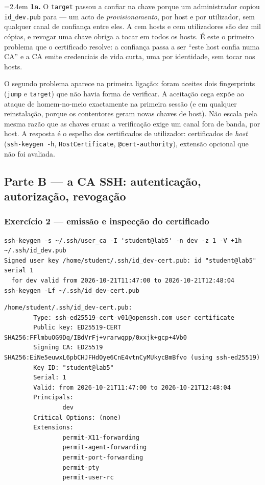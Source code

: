 \documentclass[a4paper,11pt]{article}
\newenvironment{answer}[1]{%
  \par\addvspace{7pt}\noindent
  \hangindent=2.4em\hangafter=1
  {\color{sscnblue}\bfseries #1\hspace{0.55em}}\ignorespaces}
  {\par\addvspace{5pt}}
\newcommand{\cmd}[1]{\textcolor{sscnblue}{\texttt{#1}}}
\newcommand{\file}[1]{\texttt{\detokenize{#1}}}
\begin{document}
\begin{answer}{1a.}
O \cmd{target} passou a confiar na chave porque um administrador copiou
\cmd{id\_dev.pub} para \file{/home/dev/.ssh/authorized_keys} --- um acto de
\emph{provisionamento}, por host e por utilizador, sem qualquer canal de confian\c{c}a
entre eles. A cem hosts e cem utilizadores s\~ao dez mil c\'opias, e revogar uma chave
obriga a tocar em todos os hosts. \'E este o primeiro problema que o certificado resolve:
a confian\c{c}a passa a ser ``este host confia numa CA'' e a CA emite credenciais de vida
curta, uma por identidade, sem tocar nos hosts.

O segundo problema aparece na primeira liga\c{c}\~ao: foram aceites dois fingerprints
(\cmd{jump} e \cmd{target}) que n\~ao havia forma de verificar. A aceita\c{c}\~ao cega
exp\~oe ao ataque de homem-no-meio exactamente na primeira sess\~ao (e em qualquer
reinstala\c{c}\~ao, porque os contentores geram novas chaves de host). N\~ao escala pela
mesma raz\~ao que as chaves cruas: a verifica\c{c}\~ao exige um canal fora de banda, por
host. A resposta \'e o espelho dos certificados de utilizador: certificados de
\emph{host} (\cmd{ssh-keygen -h}, \cmd{HostCertificate}, \cmd{@cert-authority}), extens\~ao
opcional que n\~ao foi avaliada.
\end{answer}

\subsection{Parte B --- a CA SSH: autentica\c{c}\~ao, autoriza\c{c}\~ao, revoga\c{c}\~ao}

\subsubsection{Exerc\'icio 2 --- emiss\~ao e inspec\c{c}\~ao do certificado}

\begin{lstlisting}
ssh-keygen -s ~/.ssh/user_ca -I 'student@lab5' -n dev -z 1 -V +1h ~/.ssh/id_dev.pub
Signed user key /home/student/.ssh/id_dev-cert.pub: id "student@lab5" serial 1
  for dev valid from 2026-10-21T11:47:00 to 2026-10-21T12:48:04
ssh-keygen -Lf ~/.ssh/id_dev-cert.pub
\end{lstlisting}

\begin{lstlisting}
/home/student/.ssh/id_dev-cert.pub:
        Type: ssh-ed25519-cert-v01@openssh.com user certificate
        Public key: ED25519-CERT SHA256:FFlmbuOG9Dq/IBdVrFj+vrarwqpp/0xxjk+gcp+4Vb0
        Signing CA: ED25519 SHA256:EiNe5euwxL6pbCHJFHdOye6CnE4vtnCyMUkycBmBfvo (using ssh-ed25519)
        Key ID: "student@lab5"
        Serial: 1
        Valid: from 2026-10-21T11:47:00 to 2026-10-21T12:48:04
        Principals:
                dev
        Critical Options: (none)
        Extensions:
                permit-X11-forwarding
                permit-agent-forwarding
                permit-port-forwarding
                permit-pty
                permit-user-rc
\end{lstlisting}
\end{document}
